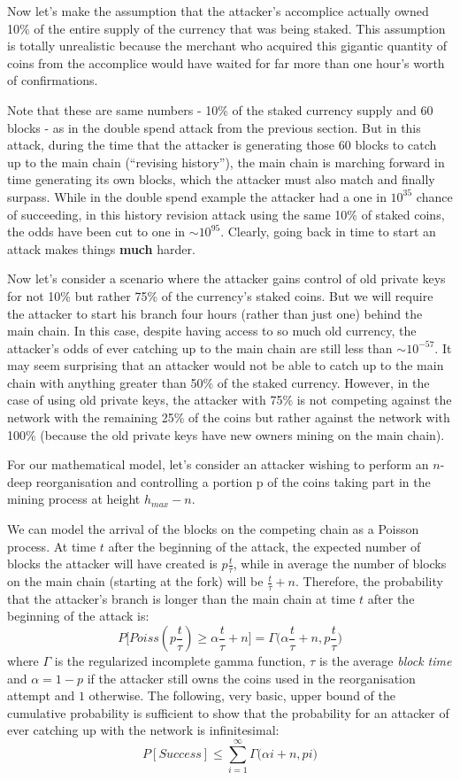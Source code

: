 \documentclass[a4paper,11pt]{article}
\begin{document}
Now let's make the assumption that the attacker's accomplice actually owned 10\% of the entire supply of the currency that was being staked. This assumption is totally unrealistic because the merchant who acquired this gigantic quantity of coins from the accomplice would have waited for far more than one hour's worth of confirmations. 

Note that these are same numbers - 10\% of the staked currency supply and 60 blocks - as in the double spend attack from the previous section. But in this attack, during the time that the attacker is generating those 60 blocks to catch up to the main chain (``revising history''), the main chain is marching forward in time generating its own blocks, which the attacker must also match and finally surpass. While in the double spend example the attacker had a one in $10^{35}$ chance of succeeding, in this history revision attack using the same 10\% of staked coins, the odds have been cut to one in $\sim10^{95}$. Clearly, going back in time to start an attack makes things \textbf{much} harder.
 
Now let's consider a scenario where the attacker gains control of old private keys for not 10\% but rather 75\% of the currency's staked coins. But we will require the attacker to start his branch four hours (rather than just one) behind the main chain. In this case, despite having access to so much old currency, the attacker's odds of ever catching up to the main chain are still less than $\sim10^{-57}$. It may seem surprising that an attacker would not be able to catch up to the main chain with anything greater than 50\% of the staked currency. However, in the case of using old private keys, the attacker with 75\% is not competing against the network with the remaining 25\% of the coins but rather against the network with 100\% (because the old private keys have new owners mining on the main chain).

 
For our mathematical model, let's consider an attacker wishing to perform an $n$-deep reorganisation and controlling a portion p of the coins taking part in the mining process at height $h_{max}-n$.

We can model the arrival of the blocks on the competing chain as a Poisson process. At time $t$ after the beginning of the attack, the expected number of blocks the attacker will have created is $p \frac{t}{\tau}$, while in average the number of blocks on the main chain (starting at the fork) will be $\frac{t}{\tau}+n$. Therefore, the probability that the attacker's branch is longer than the main chain at time $t$ after the beginning of the attack is:
$$P\big[ Poiss(p\frac{t}{\tau})\geq \alpha \frac{t}{\tau} +n\big]=\Gamma\big(\alpha \frac{t}{\tau} +n,p\frac{t}{\tau}\big)$$
where $\Gamma$ is the regularized incomplete gamma function, $\tau$ is the average \textit{block time} and $\alpha=1-p$ if the attacker still owns the coins used in the reorganisation attempt and $1$ otherwise.
\newpage
The following, very basic, upper bound of the cumulative probability is sufficient to show that the probability for an attacker of ever catching up with the network is infinitesimal:
$$P[Success]\leq \sum\limits_{i=1}^\infty \Gamma\big(\alpha i+n,pi)$$ 
\end{document}
